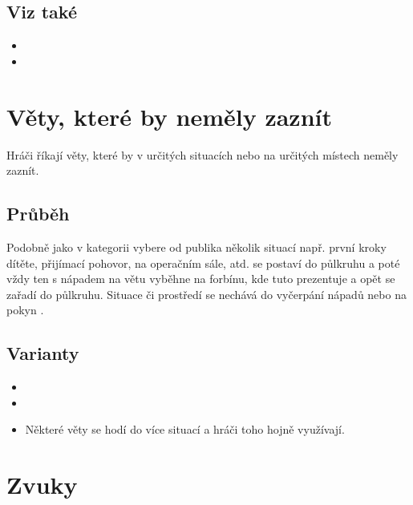 \subsection{Viz také} \begin{itemize}
\item {}
\item {}
\end{itemize}
 
 
 
\needspace{5cm} \section{Věty, které by neměly zaznít} \label{věty, které by neměly zaznít}  
 
 
Hráči říkají věty, které by v určitých situacích nebo na určitých místech neměly zaznít. 
 
 
\subsection{ Průběh } Podobně jako v kategorii  vybere  od publika několik situací např. první kroky dítěte, přijímací pohovor, na operačním sále, atd.  se postaví do půlkruhu a poté vždy ten s nápadem na větu vyběhne na forbínu, kde tuto  prezentuje a opět se zařadí do půlkruhu. Situace či prostředí se nechává do vyčerpání nápadů nebo na pokyn . 
 
\subsection{ Varianty } \begin{itemize}
\item  {}
\item  {}
\item  Některé věty se hodí do více situací a hráči toho hojně využívají.
\end{itemize}
 
 
 
 
\needspace{5cm} \section{Zvuky} \label{zvuky}  
 
